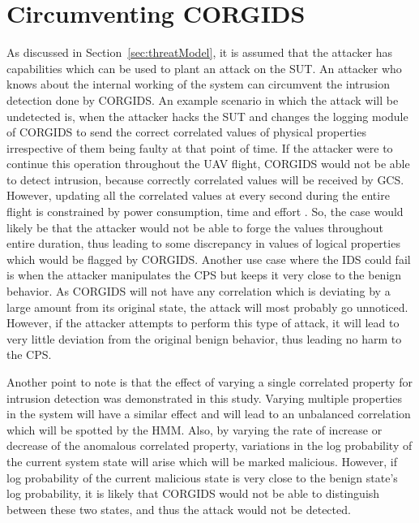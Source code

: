 \section{Circumventing \ac{CORGIDS}}
As discussed in Section~\ref{sec:threatModel}, it is assumed that the attacker has capabilities which can be used to plant an attack on the \ac{SUT}. An attacker who knows about the internal working of the system can circumvent the intrusion detection done by \ac{CORGIDS}. An example scenario in which the attack will be undetected is, when the attacker hacks the \ac{SUT} and changes the logging module of \ac{CORGIDS} to send the correct correlated values of physical properties irrespective of them being faulty at that point of time. If the attacker were to continue this operation throughout the \ac{UAV} flight, \ac{CORGIDS} would not be able to detect intrusion, because correctly correlated values will be received by \ac{GCS}. However, updating all the correlated values at every second during the entire flight is constrained by power consumption, time and effort \cite{krotofil2015process}. So, the case would likely be that the attacker would  not be able to forge the values throughout entire duration, thus leading to some discrepancy in values of logical properties which would be flagged by \ac{CORGIDS}. Another use case where the IDS could fail is when the attacker manipulates the \ac{CPS} but keeps it very close to the benign behavior. As \ac{CORGIDS} will not have any correlation which is deviating by a large amount from its original state, the attack will most probably go unnoticed. However, if the attacker attempts to perform this type of attack, it will lead to very little deviation from the original benign behavior, thus leading no harm to the \ac{CPS}.

Another point to note is that the effect of varying a single correlated property for intrusion detection was demonstrated in this study. Varying multiple properties in the system will have a similar effect and will lead to an unbalanced correlation which will be spotted by the \ac{HMM}. Also, by varying the rate of increase or decrease of the anomalous correlated property, variations in the log probability of the current system state will arise which will be marked malicious. However, if log probability of the current malicious state is very close to the benign state's log probability, it is likely that \ac{CORGIDS} would not be able to distinguish between these two states, and thus the attack would not be detected.
\endinput
=====================================================================


